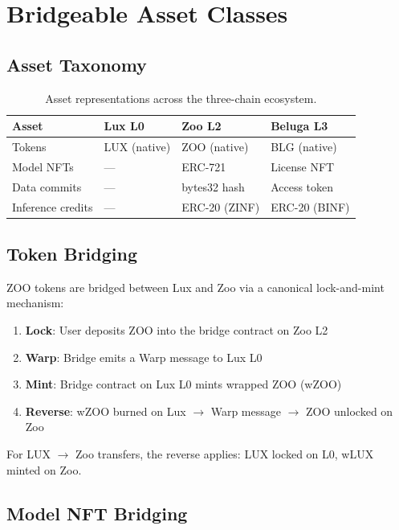 \documentclass[11pt,letterpaper]{article}
\begin{document}
\section{Bridgeable Asset Classes}
\label{sec:assets}

\subsection{Asset Taxonomy}

\begin{table}[t]
\centering
\begin{tabular}{llll}
\toprule
\textbf{Asset} & \textbf{Lux L0} & \textbf{Zoo L2} & \textbf{Beluga L3} \\
\midrule
Tokens & LUX (native) & ZOO (native) & BLG (native) \\
Model NFTs & --- & ERC-721 & License NFT \\
Data commits & --- & bytes32 hash & Access token \\
Inference credits & --- & ERC-20 (ZINF) & ERC-20 (BINF) \\
\bottomrule
\end{tabular}
\caption{Asset representations across the three-chain ecosystem.}
\label{tab:assets}
\end{table}

\subsection{Token Bridging}

ZOO tokens are bridged between Lux and Zoo via a canonical lock-and-mint mechanism:

\begin{enumerate}
    \item \textbf{Lock}: User deposits ZOO into the bridge contract on Zoo L2
    \item \textbf{Warp}: Bridge emits a Warp message to Lux L0
    \item \textbf{Mint}: Bridge contract on Lux L0 mints wrapped ZOO (wZOO)
    \item \textbf{Reverse}: wZOO burned on Lux $\to$ Warp message $\to$ ZOO unlocked on Zoo
\end{enumerate}

For LUX $\to$ Zoo transfers, the reverse applies: LUX locked on L0, wLUX minted on Zoo.

\subsection{Model NFT Bridging}
\end{document}

